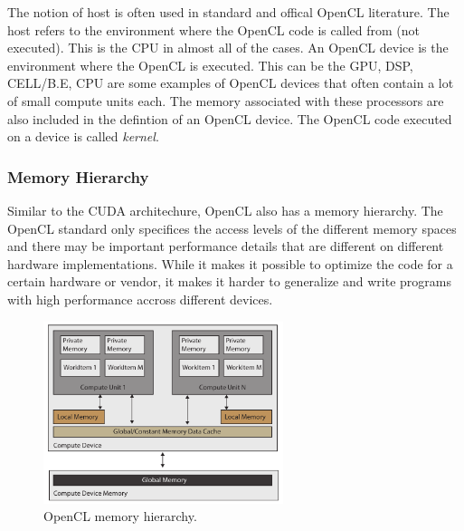 The notion of host is often used in standard and offical OpenCL literature. The host refers to the environment where the OpenCL code is called from (not executed). This is the CPU in almost all of the cases. An OpenCL device is the environment where the OpenCL is executed. This can be the GPU, DSP, CELL/B.E, CPU are some examples of OpenCL devices that often contain a lot of small compute units each. The memory associated with these processors are also included in the defintion of an OpenCL device. The OpenCL code executed on a device is called \emph{kernel}.
\newline

\subsubsection{Memory Hierarchy}

Similar to the CUDA architechure, OpenCL also has a memory hierarchy. The OpenCL standard only specifices the access levels of the different memory spaces and there may be important performance details that are different on different hardware implementations. While it makes it possible to optimize the code for a certain hardware or vendor, it makes it harder to generalize and write programs with high performance accross different devices. 

\begin{figure}[ht!]
\centering
\includegraphics[width=70mm]{img/opencl.pdf}
\caption{OpenCL memory hierarchy.}
\label{cl-mem}
\end{figure}

